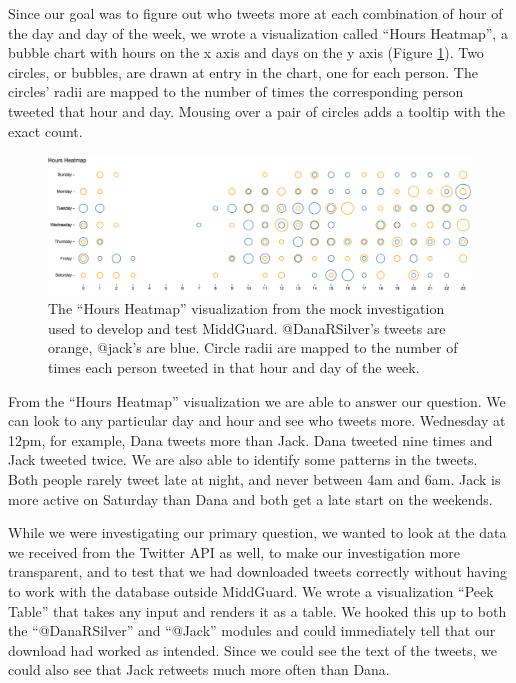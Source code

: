 \documentclass[midd]{thesis}
\begin{document}
Since our goal was to figure out who tweets more at each combination of hour of
the day and day of the week, we wrote a visualization called ``Hours Heatmap'',
a bubble chart with hours on the x axis and days on the y axis (Figure
\ref{fig:punchcard}). Two circles, or bubbles, are drawn at entry in the chart,
one for each person. The circles' radii are mapped to the number of times the
corresponding person tweeted that hour and day. Mousing over a pair of circles
adds a tooltip with the exact count.

\begin{figure}[!ht]
  \centering
  \includegraphics[width=1\textwidth]{punchcard}
  \caption[A visualization rendered in the browser.]{The ``Hours Heatmap''
  visualization from the mock investigation used to develop and test MiddGuard.
  @DanaRSilver's tweets are orange, @jack's are blue. Circle radii are mapped to
  the number of times each person tweeted in that hour and day of the week.}
  \label{fig:punchcard}
\end{figure}

From the ``Hours Heatmap'' visualization we are able to answer our question. We
can look to any particular day and hour and see who tweets more. Wednesday at
12pm, for example, Dana tweets more than Jack. Dana tweeted nine times and Jack
tweeted twice. We are also able to identify some patterns in the tweets. Both
people rarely tweet late at night, and never between 4am and 6am. Jack is more
active on Saturday than Dana and both get a late start on the weekends.

While we were investigating our primary question, we wanted to look at the data
we received from the Twitter API as well, to make our investigation more
transparent, and to test that we had downloaded tweets correctly without having
to work with the database outside MiddGuard. We wrote a visualization ``Peek
Table'' that takes any input and renders it as a table. We hooked this up to
both the ``@DanaRSilver'' and ``@Jack'' modules and could immediately tell that
our download had worked as intended. Since we could see the text of the tweets,
we could also see that Jack retweets much more often than Dana.
\end{document}
